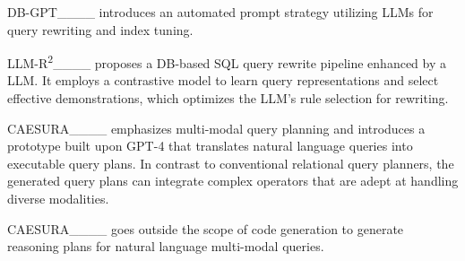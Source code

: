 {%
DB-GPT____ introduces an automated prompt strategy utilizing LLMs for query rewriting and index tuning. 

LLM-R\textsuperscript{2}____ proposes a DB-based SQL query rewrite pipeline enhanced by a LLM. It employs a contrastive model to learn query representations and select effective demonstrations, which optimizes the LLM's rule selection for rewriting.

CAESURA____ emphasizes multi-modal query planning and introduces a prototype built upon GPT-4 that translates natural language queries into executable query plans. In contrast to conventional relational query planners, the generated query plans can integrate complex operators that are adept at handling diverse modalities.

CAESURA____ goes outside the scope of code generation to generate reasoning plans
for natural language multi-modal queries.
}









